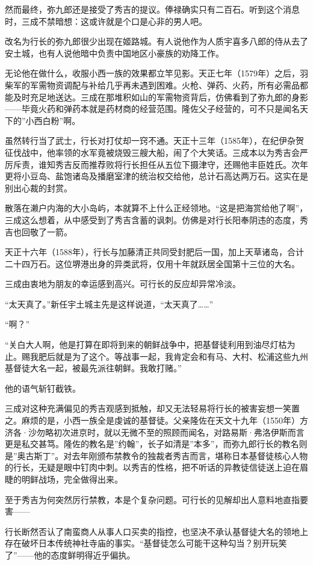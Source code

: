 \documentclass[
]{book}
\begin{document}
然而最终，弥九郎还是接受了秀吉的提议。俸禄确实只有二百石。听到这个消息时，三成不禁暗想：这或许就是个口是心非的男人吧。

改名为行长的弥九郎很少出现在姬路城。有人说他作为人质宇喜多八郎的侍从去了安土城，也有人说他暗中负责中国地区小豪族的劝降工作。

无论他在做什么，收服小西一族的效果都立竿见影。天正七年（1579年）之后，羽柴军的军需物资调配与补给几乎再未遇到困难。火枪、弹药、火药，所有必需品都能及时充足地送达。三成在那堆积如山的军需物资背后，仿佛看到了弥九郎的身影------毕竟火药和弹药本就是药材商的经营范围。隆佐父子经营的，可不只是闻名天下的''小西白粉''啊。

虽然转行当了武士，行长对打仗却一窍不通。天正十三年（1585年），在纪伊杂贺征伐战中，他率领的水军竟被烧毁三艘大船，闹了个大笑话。三成本以为秀吉会严厉斥责，谁知秀吉反而推荐败将行长担任从五位下摄津守，还赐他丰臣姓氏。次年更将小豆岛、盐饱诸岛及播磨室津的统治权交给他，总计石高达两万石。这实在是别出心裁的封赏。

散落在濑户内海的大小岛屿，本就算不上什么正经领地。``这是把海赏给他了啊''，三成这么想着，从中感受到了秀吉含蓄的讽刺。仿佛是对行长阳奉阴违的态度，秀吉也回敬了一箭。

天正十六年（1588年），行长与加藤清正共同受封肥后一国，加上天草诸岛，合计二十四万石。这位堺港出身的异类武将，仅用十年就跃居全国第十三位的大名。

三成由衷地为朋友的幸运感到高兴。可行长的反应却异常冷淡。

``太天真了。''新任宇土城主先是这样说道，``太天真了\ldots\ldots{}''

``啊？''

``关白大人啊，他是打算在即将到来的朝鲜战争中，把基督徒利用到油尽灯枯为止。赐我肥后就是为了这个。等战事一起，我肯定会和有马、大村、松浦这些九州基督徒大名一起，被最先派往朝鲜。我敢打赌。''

他的语气斩钉截铁。

三成对这种充满偏见的秀吉观感到抵触，却又无法轻易将行长的被害妄想一笑置之。麻烦的是，小西一族全是虔诚的基督徒。父亲隆佐在天文十九年（1550年）方济各·沙勿略初次进京时，就以无微不至的照顾而闻名，对路易斯·弗洛伊斯而言更是私交甚笃。隆佐的教名是''约翰''，长子如清是''本多''，而弥九郎行长的教名则是''奥古斯丁''。对去年刚颁布禁教令的独裁者秀吉而言，堪称日本基督徒核心人物的行长，无疑是眼中钉肉中刺。以秀吉的性格，把不听话的异教徒信徒送上迫在眉睫的明鲜战场，完全做得出来。

至于秀吉为何突然厉行禁教，本是个复杂问题。可行长的见解却出人意料地直指要害------

行长断然否认了南蛮商人从事人口买卖的指控，也坚决不承认基督徒大名的领地上存在破坏日本传统神社寺庙的事实。``基督徒怎么可能干这种勾当？别开玩笑了''------他的态度鲜明得近乎偏执。
\end{document}
